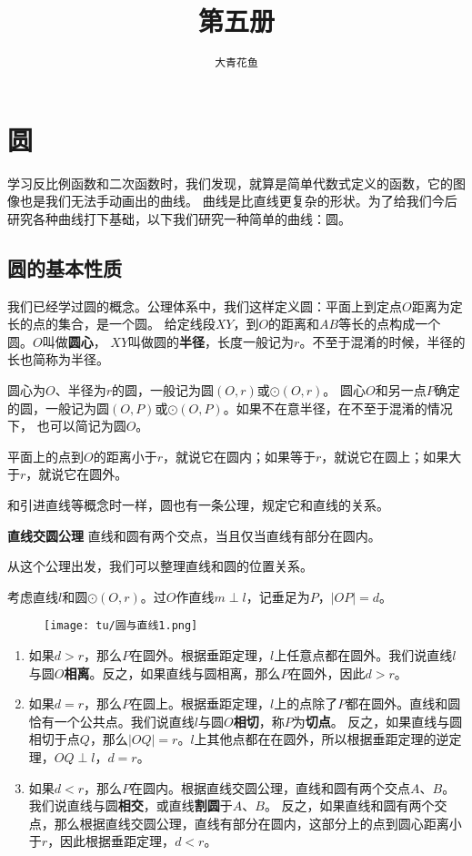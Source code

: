 \documentclass[12pt,UTF8]{ctexbook}
\title{\zihao{0} \bfseries 第五册}
\author{\zihao{2} \texttt{大青花鱼}}
\date{}
\begin{document}
\maketitle
\tableofcontents
\newpage

\chapter{圆}

学习反比例函数和二次函数时，我们发现，就算是简单代数式定义的函数，它的图像也是我们无法手动画出的曲线。
曲线是比直线更复杂的形状。为了给我们今后研究各种曲线打下基础，以下我们研究一种简单的曲线：圆。

\section{圆的基本性质}
我们已经学过圆的概念。公理体系中，我们这样定义圆：平面上到定点$O$距离为定长的点的集合，是一个圆。
给定线段$XY$，到$O$的距离和$AB$等长的点构成一个圆。$O$叫做\textbf{圆心}，
$XY$叫做圆的\textbf{半径}，长度一般记为$r$。不至于混淆的时候，半径的长也简称为半径。

圆心为$O$、半径为$r$的圆，一般记为圆$(O, r)$或$\odot{(O, r)}$。
圆心$O$和另一点$P$确定的圆，一般记为圆$(O, P)$或$\odot{(O, P)}$。如果不在意半径，在不至于混淆的情况下，
也可以简记为圆$O$。

平面上的点到$O$的距离小于$r$，就说它在圆内；如果等于$r$，就说它在圆上；如果大于$r$，就说它在圆外。

和引进直线等概念时一样，圆也有一条公理，规定它和直线的关系。
\begin{po}\textbf{直线交圆公理}\label{po:0}
    直线和圆有两个交点，当且仅当直线有部分在圆内。
\end{po}

从这个公理出发，我们可以整理直线和圆的位置关系。

考虑直线$l$和圆$\odot{(O, r)}$。过$O$作直线$m\perp l$，记垂足为$P$，$|OP| = d$。

\begin{figure}[h] %
    \vspace{8pt}
    \centering
    \texttt{[image: tu/圆与直线1.png]}
\end{figure}

\begin{enumerate}
    \item 如果$d > r$，那么$P$在圆外。根据垂距定理，$l$上任意点都在圆外。我们说直线$l$与圆$O$\textbf{相离}。反之，如果直线与圆相离，那么$P$在圆外，因此$d > r$。
    \item 如果$d = r$，那么$P$在圆上。根据垂距定理，$l$上的点除了$P$都在圆外。直线和圆恰有一个公共点。我们说直线$l$与圆$O$\textbf{相切}，称$P$为\textbf{切点}。
    反之，如果直线与圆相切于点$Q$，那么$|OQ| = r$。$l$上其他点都在在圆外，所以根据垂距定理的逆定理，$OQ \perp l$，$d = r$。
    \item 如果$d < r$，那么$P$在圆内。根据直线交圆公理，直线和圆有两个交点$A$、$B$。我们说直线与圆\textbf{相交}，或直线\textbf{割圆}于$A$、$B$。
    反之，如果直线和圆有两个交点，那么根据直线交圆公理，直线有部分在圆内，这部分上的点到圆心距离小于$r$，因此根据垂距定理，$d < r$。
\end{enumerate}
\end{document}
